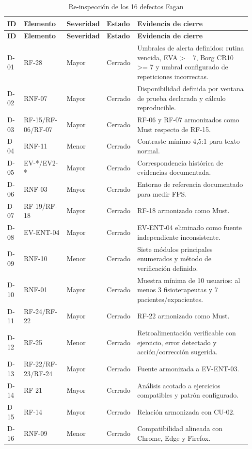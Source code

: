 \documentclass[12pt,a4paper]{article}
\begin{document}
\scriptsize
\begin{longtable}{p{}p{}p{}p{}p{}}
\caption{Re-inspección de los 16 defectos Fagan}\\
\toprule
\textbf{ID}&\textbf{Elemento}&\textbf{Severidad}&\textbf{Estado}&\textbf{Evidencia de cierre}\\
\midrule\endfirsthead
\toprule
\textbf{ID}&\textbf{Elemento}&\textbf{Severidad}&\textbf{Estado}&\textbf{Evidencia de cierre}\\
\midrule\endhead
D-01 & RF-28 & Mayor & Cerrado & Umbrales de alerta definidos: rutina vencida, EVA >= 7, Borg CR10 >= 7 y umbral configurado de repeticiones incorrectas. \\
D-02 & RNF-07 & Mayor & Cerrado & Disponibilidad definida por ventana de prueba declarada y cálculo reproducible. \\
D-03 & RF-15/RF-06/RF-07 & Mayor & Cerrado & RF-06 y RF-07 armonizados como Must respecto de RF-15. \\
D-04 & RNF-11 & Menor & Cerrado & Contraste mínimo 4,5:1 para texto normal. \\
D-05 & EV-*/EV2-* & Mayor & Cerrado & Correspondencia histórica de evidencias documentada. \\
D-06 & RNF-03 & Mayor & Cerrado & Entorno de referencia documentado para medir FPS. \\
D-07 & RF-19/RF-18 & Mayor & Cerrado & RF-18 armonizado como Must. \\
D-08 & EV-ENT-04 & Mayor & Cerrado & EV-ENT-04 eliminado como fuente independiente inconsistente. \\
D-09 & RNF-10 & Menor & Cerrado & Siete módulos principales enumerados y método de verificación definido. \\
D-10 & RNF-01 & Mayor & Cerrado & Muestra mínima de 10 usuarios: al menos 3 fisioterapeutas y 7 pacientes/expacientes. \\
D-11 & RF-24/RF-22 & Mayor & Cerrado & RF-22 armonizado como Must. \\
D-12 & RF-25 & Menor & Cerrado & Retroalimentación verificable con ejercicio, error detectado y acción/corrección sugerida. \\
D-13 & RF-22/RF-23/RF-24 & Mayor & Cerrado & Fuente armonizada a EV-ENT-03. \\
D-14 & RF-21 & Mayor & Cerrado & Análisis acotado a ejercicios compatibles y patrón configurado. \\
D-15 & RF-14 & Mayor & Cerrado & Relación armonizada con CU-02. \\
D-16 & RNF-09 & Menor & Cerrado & Compatibilidad alineada con Chrome, Edge y Firefox. \\
\bottomrule\end{longtable}\normalsize
\end{document}
